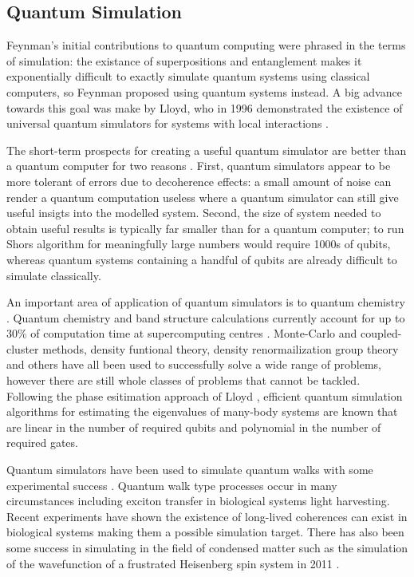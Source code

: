 \subsection{Quantum Simulation}

Feynman's initial contributions to quantum computing \cite{feynman_82} were phrased in the terms of simulation: the existance of superpositions and entanglement makes it exponentially difficult to exactly simulate quantum systems using classical computers, so Feynman proposed using quantum systems instead. A big advance towards this goal was make by Lloyd, who in 1996 demonstrated the existence of universal quantum simulators for systems with local interactions \cite{lloyd_universal_simulators}.

The short-term prospects for creating a useful quantum simulator are better than a quantum computer for two reasons \cite{simulation_ion_review}. First, quantum simulators appear to be more tolerant of errors due to decoherence effects: a small amount of noise can render a quantum computation useless where a quantum simulator can still give useful insigts into the modelled system. Second, the size of system needed to obtain useful results is typically far smaller than for a quantum computer; to run Shors algorithm for meaningfully large numbers would require 1000s of qubits, whereas quantum systems containing a handful of qubits are already difficult to simulate classically.

An important area of application of quantum simulators is to quantum chemistry \cite{science_quantum_simulator_review_09}. Quantum chemistry and band structure calculations currently account for up to 30\% of computation time at supercomputing centres \cite{simulation_photon_review, supercomputer_report_10}. Monte-Carlo and coupled-cluster methods, density funtional theory, density renormailization group theory and others have all been used to successfully solve a wide range of problems, however there are still whole classes of problems that cannot be tackled. Following the phase esitimation approach of Lloyd \cite{lloyd_simulate_eigenvalues_99, lloyd_simulate_many_body_97}, efficient quantum simulation algorithms for estimating the eigenvalues of many-body systems are known \cite{quantum_chem_alg_05, simulation_hamiltonians_11} that are linear in the number of required qubits and polynomial in the number of required gates. 

Quantum simulators have been used to simulate quantum walks \cite{farhi_quantum_walks_98} with some experimental success \cite{quantum_walks_simulated_08}. Quantum walk type processes occur in many circumstances including exciton transfer in biological systems light harvesting. Recent experiments have shown the existence of long-lived coherences can exist in biological systems \cite{quant_bio_coherences_1, quant_bio_coherences_2, quant_bio_coherences_3} making them a possible simulation target. There has also been some success in simulating in the field of condensed matter such as the simulation of the wavefunction of a frustrated Heisenberg spin system in 2011 \cite{simulation_frustrated_spins_11}.

